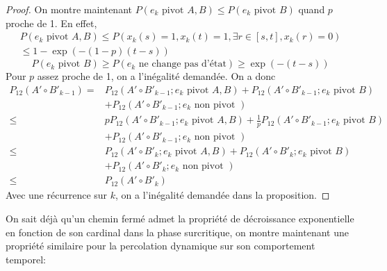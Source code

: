 \documentclass[titlepage,a4paper,11pt]{article}
\newcounter{prop}
\begin{document}
\begin{proof}
On montre maintenant $P(e_k \text{ pivot } A,B) \leqslant P(e_k \text{ pivot } B)$ quand $p$ proche de 1. En effet, 
\begin{multline*}
P(e_k \text{ pivot } A,B)\leqslant P(x_k(s) = 1, x_k(t) =1, \exists r\in [s,t], x_k(r) = 0)\\
 \leqslant 1- \exp(-(1-p)(t-s))
\end{multline*}
$$P(e_k \text{ pivot }B) \geqslant P(e_k \text{ ne change pas d'état}) \geqslant \exp(-(t-s))
$$
Pour $p$ assez proche de 1, on a l'inégalité demandée. On a donc
\begin{align*}
P_{12}(A'\circ B'_{k-1}) =& P_{12}(A'\circ B'_{k-1};e_k \text{ pivot } A,B) + P_{12}(A'\circ B'_{k-1};e_k \text{ pivot } B) \\
  &+ P_{12}(A'\circ B'_{k-1};e_k \text{ non pivot })\\
\leqslant &  p P_{12}(A'\circ B'_{k-1};e_k \text{ pivot } A,B) + \frac{1}{p}P_{12}(A'\circ B'_{k-1};e_k \text{ pivot } B) \\
  &+ P_{12}(A'\circ B'_{k-1};e_k \text{ non pivot })\\
\leqslant & P_{12}(A'\circ B'_{k};e_k \text{ pivot } A,B) + P_{12}(A'\circ B'_{k};e_k \text{ pivot } B) \\
  &+ P_{12}(A'\circ B'_{k};e_k \text{ non pivot })\\
  \leqslant & P_{12}(A'\circ B'_{k})
\end{align*}
Avec une récurrence sur $k$, on a l'inégalité demandée dans la proposition.
\end{proof}

On sait déjà qu'un chemin fermé admet la propriété de décroissance exponentielle en fonction de son cardinal dans la phase surcritique, on montre maintenant une propriété similaire pour la percolation dynamique sur son comportement temporel: 
\end{document}
